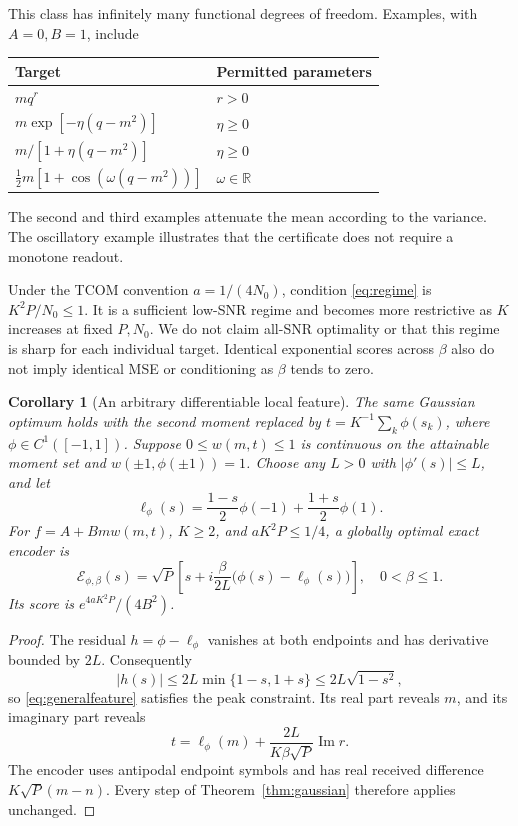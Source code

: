\documentclass[11pt,letterpaper]{article}
\newtheorem{corollary}[theorem]{Corollary}
\theoremstyle{remark}
\newcommand{\enc}{\mathscr E}
\newcommand{\R}{\mathbb R}
\begin{document}
This class has infinitely many functional degrees of freedom. Examples, with $A=0,B=1$, include
\begin{center}
\begin{tabular}{@{}ll@{}}
\toprule
Target & Permitted parameters\\
\midrule
$m q^r$ & $r>0$\\
$m\exp[-\eta(q-m^2)]$ & $\eta\ge0$\\
$m/[1+\eta(q-m^2)]$ & $\eta\ge0$\\
$\tfrac12m[1+\cos(\omega(q-m^2))]$ & $\omega\in\R$\\
\bottomrule
\end{tabular}
\end{center}
The second and third examples attenuate the mean according to the variance. The oscillatory example illustrates that the certificate does not require a monotone readout.

Under the TCOM convention $a=1/(4N_0)$, condition \eqref{eq:regime} is $K^2P/N_0\le1$. It is a sufficient low-SNR regime and becomes more restrictive as $K$ increases at fixed $P,N_0$. We do not claim all-SNR optimality or that this regime is sharp for each individual target. Identical exponential scores across $\beta$ also do not imply identical MSE or conditioning as $\beta$ tends to zero.

\begin{corollary}[An arbitrary differentiable local feature]
\label{cor:generalfeature}
The same Gaussian optimum holds with the second moment replaced by $t=K^{-1}\sum_k\phi(s_k)$, where $\phi\in C^1([-1,1])$. Suppose $0\le w(m,t)\le1$ is continuous on the attainable moment set and $w(\pm1,\phi(\pm1))=1$. Choose any $L>0$ with $|\phi'(s)|\le L$, and let
$$
 \ell_\phi(s)=\frac{1-s}{2}\phi(-1)+\frac{1+s}{2}\phi(1).
$$
For $f=A+Bmw(m,t)$, $K\ge2$, and $aK^2P\le1/4$, a globally optimal exact encoder is
\begin{equation}
 \boxed{\enc_{\phi,\beta}(s)=\sqrt P\left[
 s+i\frac{\beta}{2L}\bigl(\phi(s)-\ell_\phi(s)\bigr)\right]},
 \quad0<\beta\le1.
 \label{eq:generalfeature}
\end{equation}
Its score is $e^{4aK^2P}/(4B^2)$.
\end{corollary}
\begin{proof}
The residual $h=\phi-\ell_\phi$ vanishes at both endpoints and has derivative bounded by $2L$. Consequently
$$
 |h(s)|\le2L\min\{1-s,1+s\}\le2L\sqrt{1-s^2},
$$
so \eqref{eq:generalfeature} satisfies the peak constraint. Its real part reveals $m$, and its imaginary part reveals
$$
 t=\ell_\phi(m)+\frac{2L}{K\beta\sqrt P}\operatorname{Im}r.
$$
The encoder uses antipodal endpoint symbols and has real received difference $K\sqrt P(m-n)$. Every step of Theorem~\ref{thm:gaussian} therefore applies unchanged.
\end{proof}
\end{document}
